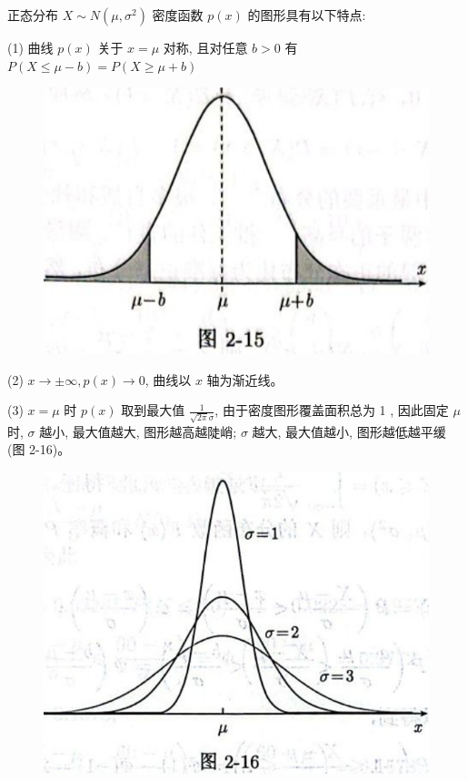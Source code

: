 \documentclass{beamer}
\begin{document}
	\begin{frame}
		正态分布 $X \sim N\left(\mu, \sigma^{2}\right)$ 密度函数 $p(x)$ 的图形具有以下特点:
		
		(1) 曲线 $p(x)$ 关于 $x=\mu$ 对称, 且对任意 $b>0$ 有 $P(X \leqslant \mu-b)=P(X \geqslant \mu+b)$
		\begin{figure}
			\centering
			\includegraphics[scale = 0.3]{figures/figure2-15}
		\end{figure}
		(2) $x \rightarrow \pm \infty, p(x) \rightarrow 0$, 曲线以 $x$ 轴为渐近线。
	\end{frame}
	
	\begin{frame}
		(3) $x=\mu$ 时 $p(x)$ 取到最大值 $\frac{1}{\sqrt{2 \pi} \sigma}$, 由于密度图形覆盖面积总为 1 , 因此固定 $\mu$ 时, $\sigma$ 越小, 最大值越大, 图形越高越陡峭; $\sigma$ 越大, 最大值越小, 图形越低越平缓 (图 2-16)。
		\begin{figure}
			\centering
			\includegraphics[scale = 0.3]{figures/figure2-16}
		\end{figure}
	\end{frame}
	
\end{document}
